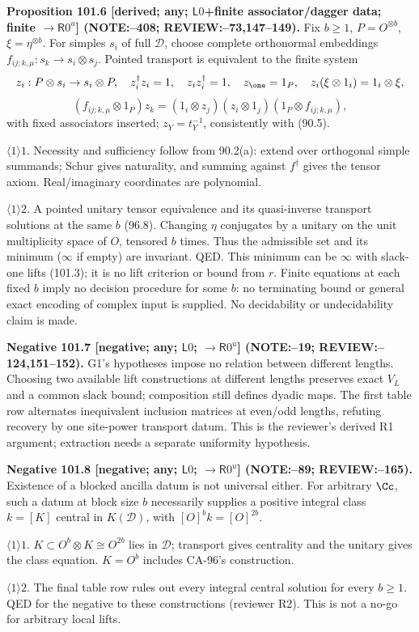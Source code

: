 \textbf{Proposition 101.6 [derived; any; \(\mathsf L0\)+finite associator/dagger data; finite \(\to\mathsf R0^u\)] (NOTE:--408; REVIEW:--73,147--149).}
Fix \(b\ge1\), \(P=O^{\otimes b}\), \(\xi=\eta^{\otimes b}\). For simples \(s_i\) of full \(\mathcal D\), choose complete
orthonormal embeddings \(f_{ij;k,\mu}:s_k\to s_i\otimes s_j\). Pointed transport is equivalent to the finite system
\[
 z_i:P\otimes s_i\to s_i\otimes P,\quad z_i^\dagger z_i=1,\quad z_i z_i^\dagger=1,\quad
 z_\one=1_P,\quad z_i(\xi\otimes1_i)=1_i\otimes\xi,
\]
\[
 (f_{ij;k,\mu}\otimes1_P)z_k=(1_i\otimes z_j)(z_i\otimes1_j)(1_P\otimes f_{ij;k,\mu}),
\]
with fixed associators inserted; \(z_Y=t_Y^{-1}\), consistently with (90.5).
\par\(\langle1\rangle1\). Necessity and sufficiency follow from 90.2(a): extend over orthogonal simple summands;
Schur gives naturality, and summing against \(f^\dagger\) gives the tensor axiom. Real/imaginary coordinates are polynomial.
\par\(\langle1\rangle2\). A pointed unitary tensor equivalence and its quasi-inverse transport solutions at the same \(b\)
(96.8). Changing \(\eta\) conjugates by a unitary on the unit multiplicity space of \(O\), tensored \(b\) times.
Thus the admissible set and its minimum (\(\infty\) if empty) are invariant. QED.
This minimum can be \(\infty\) with slack-one lifts (101.3); it is no lift criterion or bound from \(r\).
Finite equations at each fixed \(b\) imply no decision procedure for some \(b\): no terminating bound or general exact
encoding of complex input is supplied. No decidability or undecidability claim is made.

\textbf{Negative 101.7 [negative; any; \(\mathsf L0\); \(\to\mathsf R0^u\)] (NOTE:--19; REVIEW:--124,151--152).}
G1's hypotheses impose no relation between different lengths. Choosing two available lift constructions at different
lengths preserves exact \(V_L\) and a common slack bound; composition still defines dyadic maps.
The first table row alternates inequivalent inclusion matrices at even/odd lengths, refuting recovery by one
site-power transport datum. This is the reviewer's derived R1 argument; extraction needs a separate uniformity hypothesis.

\textbf{Negative 101.8 [negative; any; \(\mathsf L0\); \(\to\mathsf R0^u\)] (NOTE:--89; REVIEW:--165).}
Existence of a blocked ancilla datum is not universal either. For arbitrary \(\Cc\), such a datum at block size \(b\)
necessarily supplies a positive integral class \(k=[K]\) central in \(K(\mathcal D)\), with \([O]^b k=[O]^{2b}\).
\par\(\langle1\rangle1\). \(K\subset O^b\otimes K\cong O^{2b}\) lies in \(\mathcal D\); transport gives centrality and
the unitary gives the class equation. \(K=O^b\) includes CA-96's construction.
\par\(\langle1\rangle2\). The final table row rules out every integral central solution for every \(b\ge1\).
QED for the negative to these constructions (reviewer R2). This is not a no-go for arbitrary local lifts.

